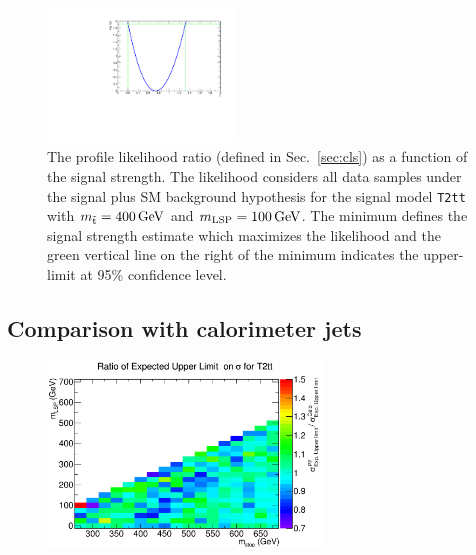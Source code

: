 \begin{figure}[h!]
  \begin{center}
      \includegraphics[width=0.45\textwidth]{figures/fit/v22/wSignal/400_100/intervalPlot_2012pf_RQcdZero_fZinvAll_1b_ge4j-1hp_2b_ge4j-1h_signal_95}
    \caption{\label{fig:t2tt-int-400_100}The profile likelihood ratio 
      (defined in Sec.~\ref{sec:cls}) as a function of the signal strength.
      The likelihood considers all data samples under the signal plus SM 
      background hypothesis for the signal model \texttt{T2tt} with 
      $m_{\tilde{\rm t}} = 400\,\text{Ge\hspace{-.08em}V}$ and $m_{\text{LSP}} = 100\,\text{Ge\hspace{-.08em}V}$.
      The minimum defines the signal strength estimate which maximizes the
      likelihood and the green vertical line on the right of the minimum 
      indicates the upper-limit at 95\% confidence level.}
  \end{center}
\end{figure}
\FloatBarrier

\subsection{Comparison with calorimeter jets}

\begin{figure}[h!]
  \begin{center}
      \includegraphics[width=0.65\textwidth]{figures/T2tt_ExpectedUpperLimit_ratio}
    \caption{\label{fig:pfVsCalo}
}
  \end{center}
\end{figure}

